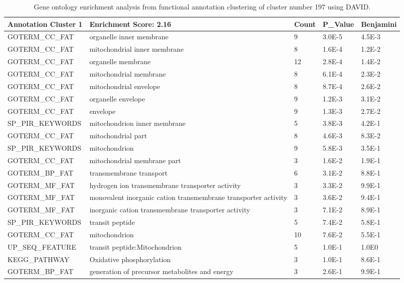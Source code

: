 \begin{table}
    \begin{tabularx}{1.0\textwidth}{ l X l l l }
      \toprule
	\textbf{Annotation Cluster 1}	& \textbf{Enrichment Score: 2.16}	& \textbf{Count}	& \textbf{P\_Value}	& \textbf{Benjamini}\\ %
      \midrule
	GOTERM\_CC\_FAT	& organelle inner membrane		& 9	& 3.0E-5	& 4.5E-3\\ 
	GOTERM\_CC\_FAT	& mitochondrial inner membrane		& 8	& 1.6E-4	& 1.2E-2\\ 
	GOTERM\_CC\_FAT	& organelle membrane			& 12	& 2.8E-4	& 1.4E-2\\ 
	GOTERM\_CC\_FAT	& mitochondrial membrane		& 8	& 6.1E-4	& 2.3E-2\\ 
	GOTERM\_CC\_FAT	& mitochondrial envelope 		& 8	& 8.7E-4	& 2.6E-2\\ 
	GOTERM\_CC\_FAT	& organelle envelope			& 9	& 1.2E-3	& 3.1E-2\\ 
	GOTERM\_CC\_FAT	& envelope				& 9	& 1.3E-3	& 2.7E-2\\ 
	SP\_PIR\_KEYWORDS	&mitochondrion inner membrane	& 5	& 3.8E-3	& 4.2E-1\\ 
	GOTERM\_CC\_FAT	& mitochondrial part			& 8	& 4.6E-3	& 8.3E-2\\ 
	SP\_PIR\_KEYWORDS	& mitochondrion			& 9	& 5.8E-3	& 3.5E-1\\ 
	GOTERM\_CC\_FAT	& mitochondrial membrane part		& 3	& 1.6E-2	& 1.9E-1\\ 
	GOTERM\_BP\_FAT	& transmembrane transport		& 6	& 3.1E-2	& 8.8E-1\\ 
	GOTERM\_MF\_FAT	& hydrogen ion transmembrane transporter activity  & 3	& 3.3E-2  & 9.9E-1\\ 
	GOTERM\_MF\_FAT & monovalent inorganic cation transmembrane transporter activity & 3	& 3.6E-2 & 9.4E-1\\ 
	GOTERM\_MF\_FAT	& inorganic cation transmembrane transporter activity & 3	& 7.1E-2 & 8.9E-1\\ 
	SP\_PIR\_KEYWORDS &transit peptide			& 5	& 7.4E-2	& 5.8E-1\\ 
	GOTERM\_CC\_FAT	& mitochondrion 			& 10	& 7.6E-2	& 5.5E-1\\ 
	UP\_SEQ\_FEATURE	& transit peptide:Mitochondrion	& 5	& 1.0E-1	& 1.0E0\\ 
	KEGG\_PATHWAY	& Oxidative phosphorylation		& 3	& 1.0E-1	& 8.6E-1\\
	GOTERM\_BP\_FAT	& generation of precursor metabolites and energy & 3	& 2.6E-1 & 9.9E-1\\
      \bottomrule
    \end{tabularx}
      \caption[Gene ontology enrichment analysis from functional annotation clustering]
      {Gene ontology enrichment analysis from functional annotation clustering of cluster number 197 using DAVID.
      \label{table:funAnno}}
\end{table}

